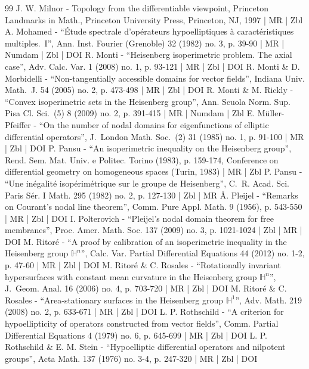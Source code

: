 \begin{thebibliography}{99}
J. W. Milnor - Topology from the differentiable viewpoint, Princeton Landmarks in Math., Princeton University Press, Princeton, NJ, 1997 | MR | Zbl
A. Mohamed - “Étude spectrale d’opérateurs hypoelliptiques à caractéristiques multiples. I”, Ann. Inst. Fourier (Grenoble) 32 (1982) no. 3, p. 39-90 | MR | Numdam | Zbl | DOI
R. Monti - “Heisenberg isoperimetric problem. The axial case”, Adv. Calc. Var. 1 (2008) no. 1, p. 93-121 | MR | Zbl | DOI
R. Monti \& D. Morbidelli - “Non-tangentially accessible domains for vector fields”, Indiana Univ. Math. J. 54 (2005) no. 2, p. 473-498 | MR | Zbl | DOI
R. Monti \& M. Rickly - “Convex isoperimetric sets in the Heisenberg group”, Ann. Scuola Norm. Sup. Pisa Cl. Sci. (5) 8 (2009) no. 2, p. 391-415 | MR | Numdam | Zbl
E. Müller-Pfeiffer - “On the number of nodal domains for eigenfunctions of elliptic differential operators”, J. London Math. Soc. (2) 31 (1985) no. 1, p. 91-100 | MR | Zbl | DOI
P. Pansu - “An isoperimetric inequality on the Heisenberg group”, Rend. Sem. Mat. Univ. e Politec. Torino (1983), p. 159-174, Conference on differential geometry on homogeneous spaces (Turin, 1983) | MR | Zbl
P. Pansu - “Une inégalité isopérimétrique sur le groupe de Heisenberg”, C. R. Acad. Sci. Paris Sér. I Math. 295 (1982) no. 2, p. 127-130 | Zbl | MR
Å. Pleijel - “Remarks on Courant’s nodal line theorem”, Comm. Pure Appl. Math. 9 (1956), p. 543-550 | MR | Zbl | DOI
I. Polterovich - “Pleijel’s nodal domain theorem for free membranes”, Proc. Amer. Math. Soc. 137 (2009) no. 3, p. 1021-1024 | Zbl | MR | DOI
M. Ritoré - “A proof by calibration of an isoperimetric inequality in the Heisenberg group ${\mathbb{H}}^n$”, Calc. Var. Partial Differential Equations 44 (2012) no. 1-2, p. 47-60 | MR | Zbl | DOI
M. Ritoré \& C. Rosales - “Rotationally invariant hypersurfaces with constant mean curvature in the Heisenberg group $\mathbb{H}^n$”, J. Geom. Anal. 16 (2006) no. 4, p. 703-720 | MR | Zbl | DOI
M. Ritoré \& C. Rosales - “Area-stationary surfaces in the Heisenberg group $\mathbb{H}^1$”, Adv. Math. 219 (2008) no. 2, p. 633-671 | MR | Zbl | DOI
L. P. Rothschild - “A criterion for hypoellipticity of operators constructed from vector fields”, Comm. Partial Differential Equations 4 (1979) no. 6, p. 645-699 | MR | Zbl | DOI
L. P. Rothschild \& E. M. Stein - “Hypoelliptic differential operators and nilpotent groups”, Acta Math. 137 (1976) no. 3-4, p. 247-320 | MR | Zbl | DOI

\end{thebibliography}
